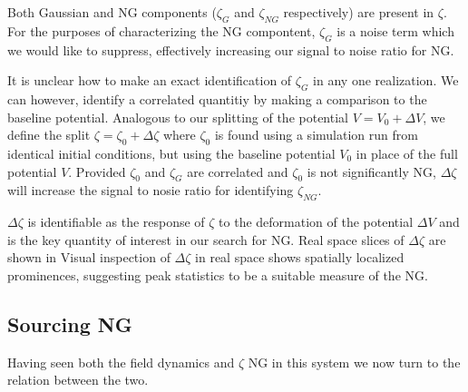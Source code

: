 Both Gaussian and NG components ($\zeta_G$ and $\zeta_{NG}$ respectively) are present in $\zeta$.
For the purposes of characterizing the NG compontent, $\zeta_G$ is a noise term which we would like to suppress, effectively increasing our signal to noise ratio for NG.

It is unclear how to make an exact identification of $\zeta_G$ in any one realization. We can however, identify a correlated quantitiy by making a comparison to the baseline potential.  
Analogous to our splitting of the potential $V = V_0 + \Delta V$, we define the split $\zeta = \zeta_0 + \Delta\zeta$ where $\zeta_0$ is found using a simulation run from identical initial conditions, but using the baseline potential $V_0$ in place of the full potential $V$.
Provided $\zeta_0$ and $\zeta_G$ are correlated and $\zeta_0$ is not significantly NG, $\Delta\zeta$ will increase the signal to nosie ratio for identifying $\zeta_{NG}$.

$\Delta\zeta$ is identifiable as the response of $\zeta$ to the deformation of the potential $\Delta V$ and is the key quantity of interest in our search for NG.
Real space slices of $\Delta\zeta$ are shown in %
Visual inspection of $\Delta\zeta$ in real space shows spatially localized prominences, suggesting peak statistics to be a suitable measure of the NG.


\subsection{Sourcing NG}



Having seen both the field dynamics and $\zeta$ NG in this system we now turn to the relation between the two.

\Fzetaslice
\Fzetapeak
\Fdzetaphasespace
\Fzetacondps
